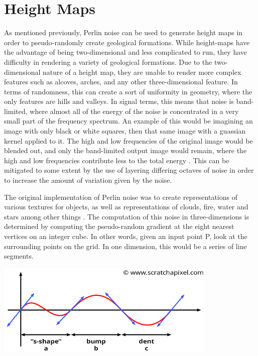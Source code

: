 \documentclass[10pt]{report}
\begin{document}
	\vspace{10pt}
	\let\clearpage\relax
	\chapter{Height Maps}
	
		As mentioned previously, Perlin noise can be used to generate height maps in order to pseudo-randomly create geological formations. While height-maps have the advantage of being two-dimensional and less complicated to run, they have difficulty in rendering a variety of geological formations. Due to the two-dimensional nature of a height map, they are unable to render more complex features such as alcoves, arches, and any other three-dimensional feature. In terms of randomness, this can create a sort of uniformity in geometry, where the only features are hills and valleys. In signal terms, this means that noise is band-limited, where almost all of the energy of the noise is concentrated in a very small part of the frequency spectrum. An example of this would be imagining an image with only black or white squares, then that same image with a guassian kernel applied to it. The high and low frequencies of the original image would be blended out, and only the band-limited output image would remain, where the high and low frequencies contribute less to the total energy \cite{making-noise}. This can be mitigated to some extent by the use of layering differing octaves of noise in order to increase the amount of variation given by the noise. 
		
		The original implementation of Perlin noise was to create representations of various textures for objects, as well as representations of clouds, fire, water and stars among other things \cite{10.1145/325165.325247}. The computation of this noise in three-dimensions is determined by computing the pseudo-random gradient at the eight nearest vertices on an integer cube. In other words, given an input point P, look at the surrounding points on the grid. In one dimension, this would be a series of line segments. 
		
		\begin{minipage}{\textwidth}
			\centering
			\includegraphics[scale=.5]{noise-value-vs-perlin3}
			\label{fig:fig25}
		\end{minipage} 
		
\end{document}

